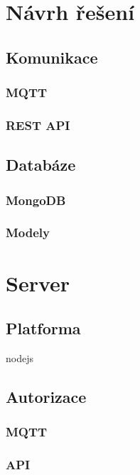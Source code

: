 \documentclass[czech,BP]{thesiskiv}
\begin{document}
	
	
	
	
	
	
	
	
	
\chapter{Návrh řešení}




		\section{Komunikace}
		
		\subsection{MQTT}
	
		\subsection{REST API}
	
	\section{Databáze}
		\subsection{MongoDB}
		\subsection{Modely}
	
	
\chapter{Server}

	\section{Platforma}
		nodejs

	\section{Autorizace}
		
	\subsection{MQTT}		
	\subsection{API}
\end{document}
